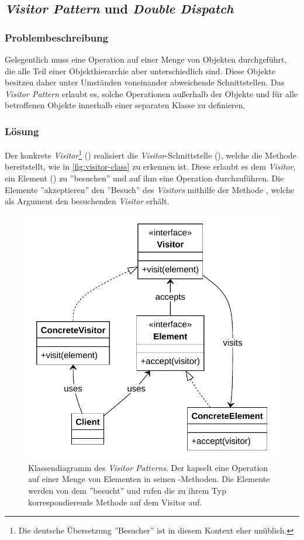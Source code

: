 \subsection{\emph{Visitor Pattern} und \emph{Double Dispatch}}


\subsubsection*{Problembeschreibung}

Gelegentlich muss eine Operation auf einer Menge von Objekten durchgeführt, die alle Teil einer Objekthierarchie aber unterschiedlich sind. Diese Objekte besitzen daher unter Umständen voneinander abweichende Schnittstellen. Das \emph{Visitor Pattern} erlaubt es, solche Operationen außerhalb der Objekte und für alle betroffenen Objekte innerhalb einer separaten Klasse zu definieren. \cite{gamma_design_1995}

\subsubsection*{Lösung}

Der konkrete \emph{Visitor}\footnote{Die deutsche Übersetzung ''Besucher'' ist in diesem Kontext eher unüblich.} () realisiert die \emph{Visitor}-Schnittstelle (), welche die Methode  bereitstellt, wie in \autoref{fig:visitor-class} zu erkennen ist. Diese erlaubt es dem \emph{Visitor}, ein Element () zu ''besuchen'' und auf ihm eine Operation durchzuführen. Die Elemente ''akzeptieren'' den ''Besuch'' des \emph{Visitors} mithilfe der Methode , welche als Argument den besuchenden \emph{Visitor} erhält.

\begin{figure}[!ht]
	\centering
	\includegraphics[width=0.75\linewidth]{images/patterns/visitor-class.pdf}
	\caption{Klassendiagramm des \emph{Visitor Patterns}. Der  kapselt eine Operation auf einer Menge von Elementen in seinen -Methoden. Die Elemente werden von dem  ''besucht'' und rufen die zu ihrem Typ korrespondierende Methode auf dem Visitor auf. \cite{skobeleva_visitor_2023}}
	\label{fig:visitor-class}
\end{figure}


